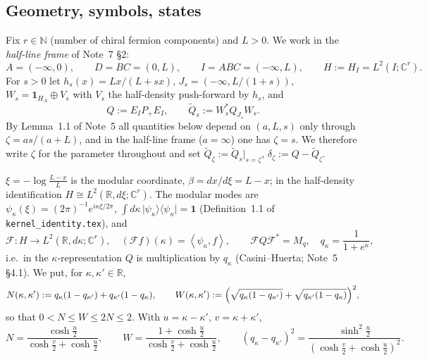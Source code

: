 \documentclass[11pt]{article}
\newcommand{\ip}[2]{\left\langle #1,#2\right\rangle}
\newcommand{\one}{\mathbf 1}
\newcommand{\Qt}{\widetilde Q}
\theoremstyle{definition}\newtheorem{problem}[theorem]{Problem}
\begin{document}
\subsection{Geometry, symbols, states}

\begin{definition}\label{def:config}
Fix \(r\in\mathbb N\) (number of chiral fermion components) and \(L>0\).  We work in the
\emph{half-line frame} of Note~7 \S2:
\[
 A=(-\infty,0),\qquad D=BC=(0,L),\qquad I=ABC=(-\infty,L),\qquad H:=H_I=L^2(I;\mathbb C^r).
\]
For \(s>0\) let \(h_s(x)=Lx/(L+sx)\), \(J_s=(-\infty,L/(1+s))\), \(W_s=\one_{H_A}\oplus V_s\) with
\(V_s\) the half-density push-forward by \(h_s\), and
\[
 Q:=E_IP_+E_I,\qquad \Qt_s:=W_s^*Q_{J_s}W_s .
\]
By Lemma~1.1 of Note~5 all quantities below depend on \((a,L,s)\) only through
\(\zeta=as/(a+L)\), and in the half-line frame (\(a=\infty\)) one has \(\zeta=s\).  We therefore
write \(\zeta\) for the parameter throughout and set \(\Qt_\zeta:=\Qt_s\big|_{s=\zeta}\),
\(\delta_\zeta:=Q-\Qt_\zeta\).
\end{definition}

\begin{definition}\label{def:frame}
\(\xi=-\log\frac{L-x}{L}\) is the modular coordinate, \(\beta=dx/d\xi=L-x\); in the half-density
identification \(H\cong L^2(\mathbb R,d\xi;\mathbb C^r)\).  The modular modes are
\(\psi_\kappa(\xi)=(2\pi)^{-1}e^{i\kappa\xi/2\pi}\), \(\int d\kappa\,\lvert\psi_\kappa\rangle\langle\psi_\kappa\rvert=\one\)
(Definition~1.1 of \texttt{kernel\_identity.tex}), and
\begin{equation}\label{eq:Qdiag}
 \mathcal F:H\to L^2(\mathbb R,d\kappa;\mathbb C^r),\quad(\mathcal Ff)(\kappa)=\ip{\psi_\kappa}{f},
 \qquad \mathcal FQ\mathcal F^*=M_{q},\quad q_\kappa=\frac1{1+e^\kappa},
\end{equation}
i.e.\ in the \(\kappa\)-representation \(Q\) is multiplication by \(q_\kappa\) (Casini--Huerta;
Note~5 \S4.1).  We put, for \(\kappa,\kappa'\in\mathbb R\),
\begin{equation}\label{eq:NW}
 N(\kappa,\kappa'):=q_\kappa(1-q_{\kappa'})+q_{\kappa'}(1-q_\kappa),\qquad
 W(\kappa,\kappa'):=\Bigl(\sqrt{q_\kappa(1-q_{\kappa'})}+\sqrt{q_{\kappa'}(1-q_\kappa)}\Bigr)^{2},
\end{equation}
so that \(0<N\le W\le 2N\le2\).  With \(u=\kappa-\kappa'\), \(v=\kappa+\kappa'\),
\begin{equation}\label{eq:NWuv}
 N=\frac{\cosh\frac u2}{\cosh\frac v2+\cosh\frac u2},\qquad
 W=\frac{1+\cosh\frac u2}{\cosh\frac v2+\cosh\frac u2},\qquad
 (q_\kappa-q_{\kappa'})^2=\frac{\sinh^2\frac u2}{(\cosh\frac v2+\cosh\frac u2)^2}.
\end{equation}
\end{definition}
\end{document}
